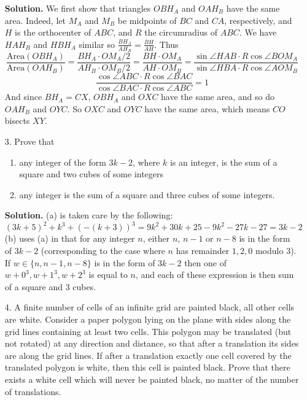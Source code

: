 \documentclass[11pt,a4paper]{article}
\begin{document}
\begin{enumerate}
	\textbf{Solution.}
	We first show that triangles $OBH_A$ and $OAH_B$ have the same area. 
	Indeed, let $M_A$ and $M_B$ be midpoints of $BC$ and $CA$, respectively, 
	and $H$ is the orthocenter of $ABC$, 
	and $R$ the circumradius of $ABC$. 
	We have $HAH_B$ and $HBH_A$ similar so $\frac{BH_A}{AH_B}=\frac{BH}{AH}$. 
	Thus
	\[
	\frac{\text{Area}(OBH_A)}{\text{Area}(OAH_B)}
	=\frac{BH_A\cdot OM_A/2}{AH_B\cdot OM_B/2}
	=\frac{BH\cdot OM_A}{AH\cdot OM_B}
	=\frac{\sin\angle HAB\cdot R\cos \angle BOM_A}{\sin\angle HBA\cdot R\cos \angle AOM_B}
	\]
	\[
	\frac{\cos\angle ABC\cdot R\cos \angle BAC}{\cos\angle BAC\cdot R\cos \angle ABC}
	=1
	\]
	And since $BH_A=CX$, $OBH_A$ and $OXC$ have the same area, 
	and so do $OAH_B$ and $OYC$. 
	So $OXC$ and $OYC$ have the same area, which means $CO$ bisects $XY$. 
	
	\item[3.]Prove that 
	\begin{enumerate}
		\item any integer of the form $3k - 2$, where $k$ is an integer, is the sum of a square and two cubes of
		some integers
		\item any integer is the sum of a square and three cubes of some integers.
	\end{enumerate}
	
	\textbf{Solution.} (a) is taken care by the following:
	\[
	(3k+5)^2 + k^3 + (-(k+3))^3 = 9k^2+30k+25-9k^2-27k-27=3k-2
	\]
	(b) uses (a) in that for any integer $n$, either $n$, $n-1$ or $n-8$ is in the form of $3k-2$ (corresponding to the case where $n$ has remainder $1, 2, 0$ modulo 3). If $w\in \{n, n-1, n-8\}$ is in the form of $3k-2$ then one of $w+0^3, w+1^3, w+2^3$ is equal to $n$, and each of these expression is then sum of a square and 3 cubes. 
	
	\item[4.]
	A finite number of cells of an infinite grid are painted black, all other cells are white. Consider
	a paper polygon lying on the plane with sides along the grid lines containing at least two cells.
	This polygon may be translated (but not rotated) at any direction and distance, so that after a
	translation its sides are along the grid lines. If after a translation exactly one cell covered by the
	translated polygon is white, then this cell is painted black. Prove that there exists a white cell
	which will never be painted black, no matter of the number of translations.
	

\end{enumerate}
\end{document}
